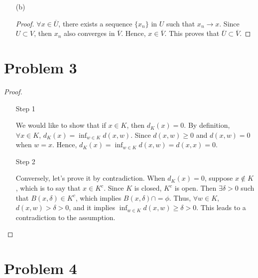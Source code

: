 \documentclass[12pt]{article}
\begin{document}
\begin{enumerate}
\begin{proof}
In conclusion, $\overline{U \cap V} = \overline U \cap \overline V$.

\end{proof}



\item [(b)]

\begin{proof}

$\forall x \in \overline U$, there exists a sequence $\{x_n\}$ in $U$ such that $x_n \rightarrow x$. Since $U \subset V$, then $x_n$ also converges in $\overline V$. Hence, $x \in \overline V$. This proves that $\overline U \subset \overline V$.

\end{proof}

\end{enumerate}

\section*{Problem 3}
\begin{proof} 
\ 
\begin{enumerate}
\item [Step 1]

We would like to show that if $x\in K$, then $d_K(x) = 0$. By definition, $\forall x\in K$, $d_K(x) = \inf_{w\in K} d(x, w)$. Since $d(x, w) \geqslant 0$ and $d(x, w) = 0$ when $w = x$. Hence, $d_K (x) = \inf_{w\in K} d(x, w) = d(x, x) = 0$.

\item [Step 2]

Conversely, let's prove it by contradiction. When $d_K(x) = 0$, suppose $x \notin K$, which is to say that $x\in K^c$. Since $K$ is closed, $K^c$ is open. Then $\exists \delta > 0 $ such that $B(x, \delta) \in K^c$, which implies $B(x, \delta) \cap = \phi$.  Thus, $\forall w \in K$, $d(x, w) > \delta > 0$, and it implies $\inf_{w\in K} d(x, w) \geqslant \delta > 0$. This leads to a contradiction to the assumption.

\end{enumerate}

\end{proof}

\section*{Problem 4}
\end{document}
